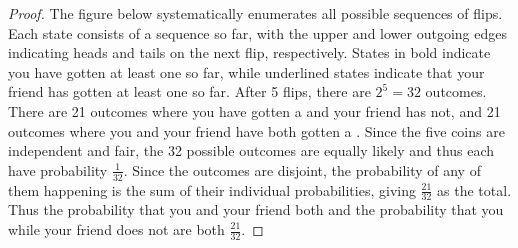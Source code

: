 \documentclass[12pt]{article}
\begin{document}
\begin{proof}
The figure below systematically enumerates all possible sequences of flips. Each state consists of a sequence so far, with the upper and lower outgoing edges indicating heads and tails on the next flip, respectively. States in bold indicate you have gotten at least one  so far, while underlined states indicate that your friend has gotten at least one  so far. After 5 flips, there are $2^5 = 32$ outcomes. There are 21 outcomes where you have gotten a  and your friend has not, and 21 outcomes where you and your friend have both gotten a . Since the five coins are independent and fair, the 32 possible outcomes are equally likely and thus each have probability $\frac{1}{32}$. Since the outcomes are disjoint, the probability of any of them happening is the sum of their individual probabilities, giving $\frac{21}{32}$ as the total. Thus the probability that you and your friend both  and the probability that you  while your friend does not are both $\frac{21}{32}$.
\end{proof}
\end{document}
